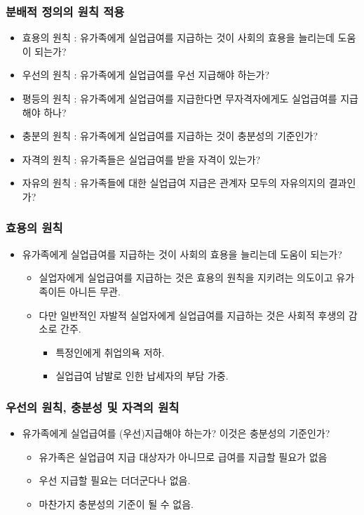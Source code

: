 \documentclass[aspectratio=169,xcolor=dvipsnames,]{beamer}
\begin{document}
\begin{frame}[<+->]
\frametitle{분배적 정의의 원칙 적용}
    \begin{itemize}
        \item 효용의 원칙 : 유가족에게 실업급여를 지급하는 것이 사회의 효용을 늘리는데 도움이 되는가?
        \item 우선의 원칙 : 유가족에게 실업급여를 우선 지급해야 하는가?
        \item 평등의 원칙 : 유가족에게 실업급여를 지급한다면 무자격자에게도 실업급여를 지급해야 하나?
        \item 충분의 원칙 : 유가족에게 실업급여를 지급하는 것이 충분성의 기준인가?
        \item 자격의 원칙 : 유가족들은 실업급여를 받을 자격이 있는가?
        \item 자유의 원칙 : 유가족들에 대한 실업급여 지급은 관계자 모두의 자유의지의 결과인가?
    \end{itemize}
\end{frame}

\begin{frame}[<+->]
\frametitle{효용의 원칙}
    \begin{itemize}
        \item 유가족에게 실업급여를 지급하는 것이 사회의 효용을 늘리는데 도움이 되는가?
        \begin{itemize}
            \item 실업자에게 실업급여를 지급하는 것은 효용의 원칙을 지키려는 의도이고 유가족이든 아니든 무관.
            \item 다만 일반적인 자발적 실업자에게 실업급여를 지급하는 것은 사회적 후생의 감소로 간주.
            \begin{itemize}
                \item 특정인에게 취업의욕 저하.
                \item 실업급여 남발로 인한 납세자의 부담 가중.
            \end{itemize}
        \end{itemize}
    \end{itemize}
\end{frame}

\begin{frame}[<+->]
\frametitle{우선의 원칙, 충분성 및 자격의 원칙}
    \begin{itemize}
        \item 유가족에게 실업급여를 (우선)지급해야 하는가? 이것은 충분성의 기준인가?
        \begin{itemize}
            \item 유가족은 실업급여 지급 대상자가 아니므로 급여를 지급할 필요가 없음
            \item 우선 지급할 필요는 더더군다나 없음.
            \item 마찬가지 충분성의 기준이 될 수 없음.
        \end{itemize}
    \end{itemize}
\end{frame}
\end{document}
